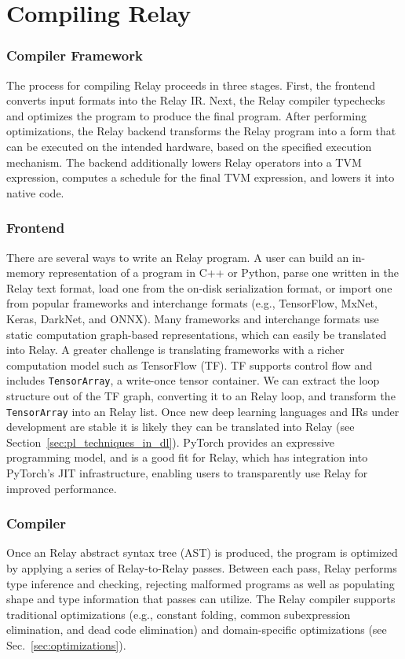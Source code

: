 \chapter{Compiling Relay}
\label{ch:compiler}


\subsection{Compiler Framework}

The process for compiling Relay proceeds in three stages.
First, the frontend converts input formats into the Relay IR.
Next, the Relay compiler typechecks and optimizes the program
  to produce the final program.
After performing optimizations,
  the Relay backend transforms
  the Relay program into a form that can be executed on
  the intended hardware, based on the specified execution mechanism.
The backend additionally lowers Relay operators into a TVM expression,
  computes a schedule for the final TVM expression, and lowers it into
  native code.

\subsection*{Frontend}

There are several ways to write an Relay program.
A user can build an in-memory representation of
  a program in C++ or Python,
  parse one written in the Relay text format,
  load one from the on-disk serialization format,
  or import one from popular frameworks and interchange formats
    (e.g., TensorFlow, MxNet, Keras, DarkNet, and ONNX).
Many frameworks and interchange formats use static computation graph-based representations,
  which can easily be translated into Relay.
A greater challenge is translating frameworks
  with a richer computation model such as TensorFlow (TF).
TF supports control flow and includes \verb|TensorArray|, a write-once
  tensor container.
We can extract the loop structure out of the TF graph, converting
  it to an Relay loop, and transform the \verb|TensorArray| into an Relay list.
Once new deep learning languages and IRs under development
  are stable it is likely they can be translated into Relay (see
  Section~\ref{sec:pl_techniques_in_dl}).
PyTorch provides an expressive programming model, and is a good fit
  for Relay, which has integration into PyTorch's JIT infrastructure,
  enabling users to transparently use Relay for improved performance.

\subsection*{Compiler}
Once an Relay abstract syntax tree (AST) is produced,
  the program is optimized by applying a series of Relay-to-Relay
  passes.
Between each pass, Relay performs type inference and checking,
  rejecting malformed programs as well as populating shape and type
  information that passes can utilize.
The Relay compiler supports traditional optimizations
  (e.g., constant folding, common subexpression elimination, and dead code elimination)
  and domain-specific optimizations
  (see Sec.~\ref{sec:optimizations}).

